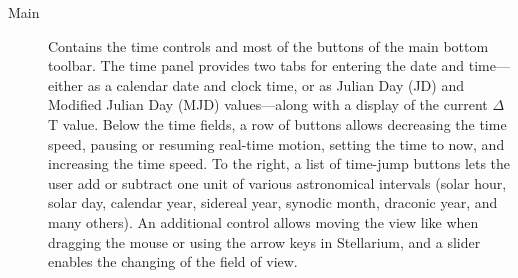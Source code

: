 \begin{description}
\item[Main] Contains the time controls and most of the buttons of the 
main bottom toolbar. The time panel provides two tabs for entering the date
and time---either as a calendar date and clock time, or as Julian Day (JD)
and Modified Julian Day (MJD) values---along with a display of the current
$\Delta$T value. Below the time fields, a row of buttons allows decreasing
the time speed, pausing or resuming real-time motion, setting the time to
now, and increasing the time speed. To the right, a list of time-jump
buttons lets the user add or subtract one unit of various astronomical
intervals (solar hour, solar day, calendar year, sidereal year, synodic
month, draconic year, and many others). An additional control allows moving
the view like when dragging the mouse or using the arrow keys in Stellarium,
and a slider enables the changing of the field of view.


\end{description}
